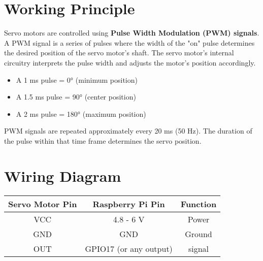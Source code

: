 \documentclass{article}
\begin{document}
	\section{Working Principle}
		Servo motors are controlled using \textbf{Pulse Width Modulation (PWM) signals}. A PWM signal is a series of pulses where the width of the "on" pulse determines the desired position of the servo motor's shaft. The servo motor's internal circuitry interprets the pulse width and adjusts the motor's position accordingly.
		\begin{itemize}
			\item A 1 ms pulse = 0° (minimum position)
			\item A 1.5 ms pulse = 90° (center position)
			\item A 2 ms pulse = 180° (maximum position)
		\end{itemize}
		PWM signals are repeated approximately every 20 ms (50 Hz). The duration of the pulse within that time frame determines the servo position.
		
	
	\section{Wiring Diagram}
	\begin{center}
		\begin{tabular}{|c|c|c|}
			\hline
			\textbf{Servo Motor Pin} & \textbf{Raspberry Pi Pin} & \textbf{Function} \\
			\hline
			VCC & 4.8 - 6 V  & Power \\
			GND & GND & Ground \\
			OUT & GPIO17 (or any output) & signal \\
			\hline
		\end{tabular}
	\end{center}
	
	\begin{center}
	\end{center}
\end{document}

